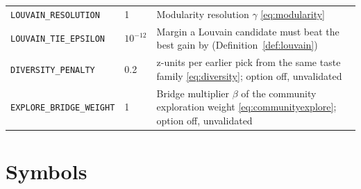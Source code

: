 \documentclass[11pt]{article}
\newcommand{\code}[1]{\texttt{#1}}
\theoremstyle{plain}
\theoremstyle{definition}
\theoremstyle{remark}
\begin{document}
\begin{center}
\begin{tabular}{@{}p{5.1cm}p{2.7cm}p{6.6cm}@{}}
\code{LOUVAIN\_RESOLUTION} & 1 & Modularity resolution $\gamma$ \eqref{eq:modularity} \\
\code{LOUVAIN\_TIE\_EPSILON} & $10^{-12}$ & Margin a Louvain candidate must beat the best gain by (Definition~\ref{def:louvain}) \\
\code{DIVERSITY\_PENALTY} & 0.2 & z-units per earlier pick from the same taste family \eqref{eq:diversity}; option off, unvalidated \\
\code{EXPLORE\_BRIDGE\_WEIGHT} & 1 & Bridge multiplier $\beta$ of the community exploration weight \eqref{eq:communityexplore}; option off, unvalidated \\
\bottomrule
\end{tabular}
\end{center}

\section{Symbols}
\end{document}
